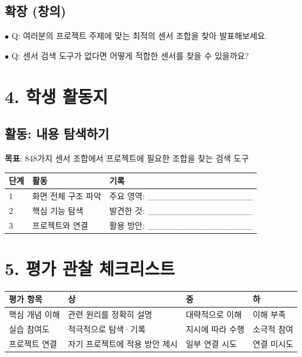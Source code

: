 \documentclass[11pt,a4paper]{article}
\begin{document}
\subsection*{확장 (창의)}

$\bullet$ Q: 여러분의 프로젝트 주제에 맞는 최적의 센서 조합을 찾아 발표해보세요.

$\bullet$ Q: 센서 검색 도구가 없다면 어떻게 적합한 센서를 찾을 수 있을까요?



\section*{4. 학생 활동지}

\subsection*{활동: 내용 탐색하기}

\textbf{목표}: 848가지 센서 조합에서 프로젝트에 필요한 조합을 찾는 검색 도구


\begin{center}
\renewcommand{\arraystretch}{1.4}
\begin{tabular}{|p{1.5cm}|p{5.6cm}|p{7.9cm}|}
\hline
\rowcolor{tableheader}
\textbf{단계} & \textbf{활동} & \textbf{기록} \\
\hline
1 & 화면 전체 구조 파악 & 주요 영역: \_\_\_\_\_\_\_\_\_\_\_\_\_\_\_\_\_ \\
\hline
2 & 핵심 기능 탐색 & 발견한 것: \_\_\_\_\_\_\_\_\_\_\_\_\_\_\_\_\_ \\
\hline
3 & 프로젝트와 연결 & 활용 방안: \_\_\_\_\_\_\_\_\_\_\_\_\_\_\_\_\_ \\
\hline
\end{tabular}
\end{center}


\section*{5. 평가 관찰 체크리스트}

\begin{center}
\renewcommand{\arraystretch}{1.4}
\begin{tabular}{|p{3.0cm}|p{6.3cm}|p{3.4cm}|p{2.3cm}|}
\hline
\rowcolor{tableheader}
\textbf{평가 항목} & \textbf{상} & \textbf{중} & \textbf{하} \\
\hline
핵심 개념 이해 & 관련 원리를 정확히 설명 & 대략적으로 이해 & 이해 부족 \\
\hline
실습 참여도 & 적극적으로 탐색·기록 & 지시에 따라 수행 & 소극적 참여 \\
\hline
프로젝트 연결 & 자기 프로젝트에 적용 방안 제시 & 일부 연결 시도 & 연결 미시도 \\
\hline
\end{tabular}
\end{center}
\end{document}
